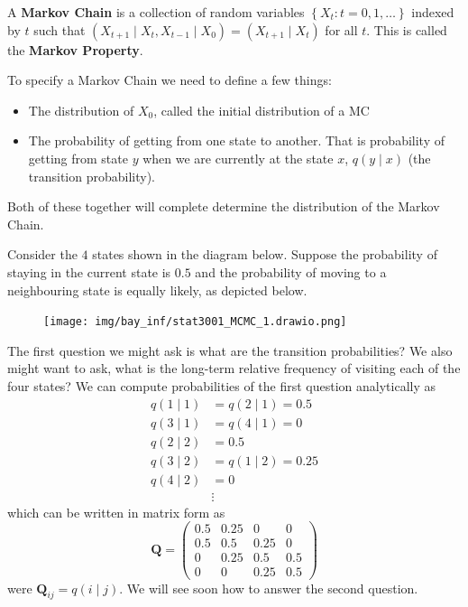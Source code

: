 \begin{defe} \label{defe: markov_chain}
    A {\bf Markov Chain} is a collection of random variables $\left\{ X_t : t = 0,1,\ldots \right\}$ indexed by $t$ such that $(X_{t+1} \mid X_{t} , X_{t-1} \mid X_{0}) = (X_{t+1} \mid X_{t})$ for all $t$. This is called the {\bf Markov Property}.
\end{defe}

To specify a Markov Chain we need to define a few things:
\begin{itemize}
    \item The distribution of $X_0$, called the initial distribution of a MC
    \item The probability of getting from one state to another. That is probability of getting from state $y$ when we are currently at the state $x$, $q (y \mid x)$ (the transition probability).
\end{itemize}
Both of these together will complete determine the distribution of the Markov Chain.

\begin{exam}\label{exam: mc_state_intro}
    Consider the $4$ states shown in the diagram below. Suppose the probability of staying in the current state is $0.5$ and the probability of moving to a neighbouring state is equally likely, as depicted below.
    \begin{figure}[H]
        \centering
        \texttt{[image: img/bay\_inf/stat3001\_MCMC\_1.drawio.png]}
        \label{fig: MCMC_ex1}
    \end{figure}
    The first question we might ask is what are the transition probabilities? We also might want to ask, what is the long-term relative frequency of visiting each of the four states? We can compute probabilities of the first question analytically as
    \begin{align*}
        q (1 \mid 1) & = q (2 \mid 1) = 0.5  \\
        q (3 \mid 1) & = q (4 \mid 1) = 0    \\
        q(2 \mid 2)  & = 0.5                 \\
        q (3 \mid 2) & = q (1 \mid 2) = 0.25 \\
        q(4 \mid 2)  & = 0                   \\
                     & \vdots
    \end{align*}
    which can be written in matrix form as
    \begin{equation*}
        \bm{Q} =
        \begin{pmatrix}
            0.5 & 0.25 & 0    & 0   \\
            0.5 & 0.5  & 0.25 & 0   \\
            0   & 0.25 & 0.5  & 0.5 \\
            0   & 0    & 0.25 & 0.5
        \end{pmatrix}
    \end{equation*}
    were ${\bm{Q}}_{ij} = q(i \mid j)$. We will see soon how to answer the second question.
\end{exam}

